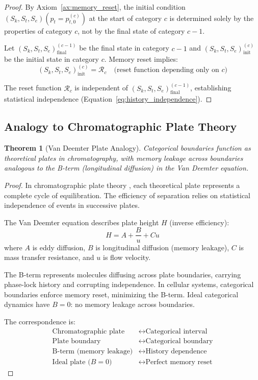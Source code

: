 \documentclass[11pt,twocolumn,a4paper]{article}
\newtheorem{theorem}{Theorem}[section]
\theoremstyle{definition}
\theoremstyle{remark}
\newcommand{\Scoord}{(\Sk,\St,\Se)}
\newcommand{\Sk}{S_k}
\newcommand{\St}{S_t}
\newcommand{\Se}{S_e}
\begin{document}
\begin{proof}
By Axiom~\ref{ax:memory_reset}, the initial condition $\Scoord(p_t = p_{t,0}^{(c)})$ at the start of category $c$ is determined solely by the properties of category $c$, not by the final state of category $c-1$.

Let $\Scoord_{\mathrm{final}}^{(c-1)}$ be the final state in category $c-1$ and $\Scoord_{\mathrm{init}}^{(c)}$ be the initial state in category $c$. Memory reset implies:
\begin{equation}
\Scoord_{\mathrm{init}}^{(c)} = \mathcal{R}_c \quad \text{(reset function depending only on } c\text{)}
\label{eq:reset_function}
\end{equation}

The reset function $\mathcal{R}_c$ is independent of $\Scoord_{\mathrm{final}}^{(c-1)}$, establishing statistical independence (Equation~\eqref{eq:history_independence}).
\end{proof}

\subsection{Analogy to Chromatographic Plate Theory}

\begin{theorem}[Van Deemter Plate Analogy]
\label{thm:van_deemter_analogy}
Categorical boundaries function as theoretical plates in chromatography, with memory leakage across boundaries analogous to the B-term (longitudinal diffusion) in the Van Deemter equation.
\end{theorem}

\begin{proof}
In chromatographic plate theory \citep{van1956new,giddings1965dynamics}, each theoretical plate represents a complete cycle of equilibration. The efficiency of separation relies on statistical independence of events in successive plates.

The Van Deemter equation describes plate height $H$ (inverse efficiency):
\begin{equation}
H = A + \frac{B}{u} + Cu
\label{eq:van_deemter}
\end{equation}
where $A$ is eddy diffusion, $B$ is longitudinal diffusion (memory leakage), $C$ is mass transfer resistance, and $u$ is flow velocity.

The B-term represents molecules diffusing across plate boundaries, carrying phase-lock history and corrupting independence. In cellular systems, categorical boundaries enforce memory reset, minimizing the B-term. Ideal categorical dynamics have $B = 0$: no memory leakage across boundaries.

The correspondence is:
\begin{align}
\text{Chromatographic plate} &\leftrightarrow \text{Categorical interval} \\
\text{Plate boundary} &\leftrightarrow \text{Categorical boundary} \\
\text{B-term (memory leakage)} &\leftrightarrow \text{History dependence} \\
\text{Ideal plate ($B=0$)} &\leftrightarrow \text{Perfect memory reset}
\end{align}
\end{proof}
\end{document}
